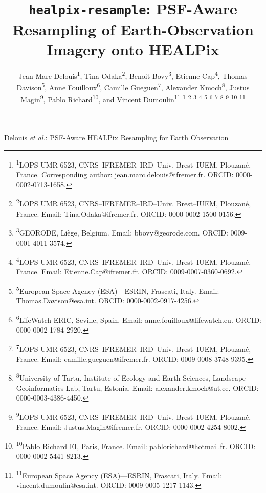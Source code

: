 \documentclass[journal]{IEEEtran}
\begin{document}
\title{\texttt{healpix-resample}: PSF-Aware Resampling of Earth-Observation Imagery onto HEALPix}

\author{
Jean-Marc Delouis\textsuperscript{1},
Tina Odaka\textsuperscript{2},
Benoit Bovy\textsuperscript{3},
Etienne Cap\textsuperscript{4},
Thomas Davison\textsuperscript{5},
Anne Fouilloux\textsuperscript{6},
Camille Gueguen\textsuperscript{7},
Alexander Kmoch\textsuperscript{8},
Justus Magin\textsuperscript{9},
Pablo Richard\textsuperscript{10},
and Vincent Dumoulin\textsuperscript{11}%
\thanks{\textsuperscript{1}LOPS UMR 6523,
CNRS--IFREMER--IRD--Univ. Brest--IUEM, Plouzané, France.
Corresponding author: jean.marc.delouis@ifremer.fr. ORCID: 0000-0002-0713-1658.}%
\thanks{\textsuperscript{2}LOPS UMR 6523,
CNRS--IFREMER--IRD--Univ. Brest--IUEM, Plouzané, France.
Email: Tina.Odaka@ifremer.fr. ORCID: 0000-0002-1500-0156.}%
\thanks{\textsuperscript{3}GEORODE, Liège, Belgium.
Email: bbovy@georode.com. ORCID: 0009-0001-4011-3574.}%
\thanks{\textsuperscript{4}LOPS UMR 6523,
CNRS--IFREMER--IRD--Univ. Brest--IUEM, Plouzané, France.
Email: Etienne.Cap@ifremer.fr. ORCID: 0009-0007-0360-0692.}%
\thanks{\textsuperscript{5}European Space Agency (ESA)---ESRIN, Frascati, Italy.
Email: Thomas.Davison@esa.int. ORCID: 0000-0002-0917-4256.}%
\thanks{\textsuperscript{6}LifeWatch ERIC, Seville, Spain.
Email: anne.fouilloux@lifewatch.eu. ORCID: 0000-0002-1784-2920.}%
\thanks{\textsuperscript{7}LOPS UMR 6523,
CNRS--IFREMER--IRD--Univ. Brest--IUEM, Plouzané, France.
Email: camille.gueguen@ifremer.fr. ORCID: 0009-0008-3748-9395.}%
\thanks{\textsuperscript{8}University of Tartu,
Institute of Ecology and Earth Sciences,
Landscape Geoinformatics Lab, Tartu, Estonia.
Email: alexander.kmoch@ut.ee. ORCID: 0000-0003-4386-4450.}%
\thanks{\textsuperscript{9}LOPS UMR 6523,
CNRS--IFREMER--IRD--Univ. Brest--IUEM, Plouzané, France.
Email: Justus.Magin@ifremer.fr. ORCID: 0000-0002-4254-8002.}%
\thanks{\textsuperscript{10}Pablo Richard EI, Paris, France.
Email: pablorichard@hotmail.fr. ORCID: 0000-0002-5441-8213.}%
\thanks{\textsuperscript{11}European Space Agency (ESA)---ESRIN, Frascati, Italy.
Email: vincent.dumoulin@esa.int. ORCID:  0009-0005-1217-1143.}%
}

%
{Delouis \MakeLowercase{\textit{et al.}}: PSF-Aware HEALPix Resampling for Earth Observation}

\maketitle
\end{document}
